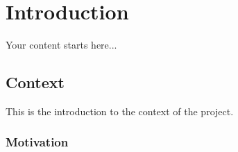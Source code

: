 \chapter{Introduction}
Your content starts here... \cite{}

\section{Context}
This is the introduction to the context of the project.

\subsection{Motivation}

